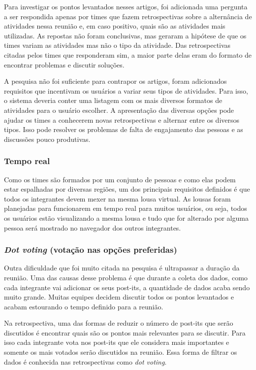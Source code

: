 Para investigar os pontos levantados nesses artigos, foi adicionada uma pergunta a ser respondida apenas por times que fazem retrospectivas sobre a alternância de atividades nessa reunião e, em caso positivo, quais são as atividades mais utilizadas. As repostas não foram conclusivas, mas geraram a hipótese de que os times variam as atividades mas não o tipo da atividade. Das retrospectivas citadas pelos times que responderam sim, a maior parte delas eram do formato de encontrar problemas e discutir soluções. 

A pesquisa não foi suficiente para contrapor os artigos, foram adicionados requisitos que incentivam os usuários a variar seus tipos de atividades. Para isso, o sistema deveria conter uma listagem com os mais diversos formatos de atividades para o usuário escolher. A apresentação das diversas opções pode ajudar os times a conhecerem novas retrospectivas e alternar entre os diversos tipos. Isso pode resolver os  problemas de falta de engajamento das pessoas e as discussões pouco produtivas.

\subsubsection*{Tempo real}

Como os times são formados por um conjunto de pessoas e como elas podem estar espalhadas por diversas regiões, um dos principais requisitos definidos é que todos os integrantes devem mexer na mesma lousa virtual. As lousas foram planejadas  para funcionarem em tempo real para muitos usuários, ou seja, todos os usuários estão visualizando a mesma lousa e tudo que for alterado por alguma pessoa será mostrado no navegador dos outros integrantes.

\subsubsection*{\textit{Dot voting} (votação nas opções preferidas)}

Outra dificuldade que foi muito citada na pesquisa é ultrapassar a duração da reunião. Uma das causas desse problema é que durante a coleta dos dados, como cada integrante vai adicionar os seus post-its, a quantidade de dados acaba sendo muito grande. Muitas equipes decidem discutir todos os pontos levantados e acabam estourando o tempo definido para a reunião.

Na retrospectiva, uma das formas de reduzir o número de post-its que serão discutidos é encontrar quais são os pontos mais relevantes para se discutir. Para isso cada integrante vota nos post-its que ele considera mais importantes e somente os mais votados serão discutidos na reunião. Essa forma de filtrar os dados é conhecida nas retrospectivas como \textit{dot voting}.

